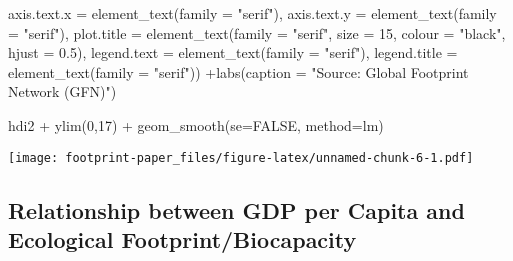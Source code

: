 \documentclass[
]{article}
\newenvironment{Shaded}{\begin{snugshade}}{\end{snugshade}}
\newcommand{\AttributeTok}[1]{\textcolor[rgb]{0.77,0.63,0.00}{#1}}
\newcommand{\ConstantTok}[1]{\textcolor[rgb]{0.00,0.00,0.00}{#1}}
\newcommand{\DecValTok}[1]{\textcolor[rgb]{0.00,0.00,0.81}{#1}}
\newcommand{\FloatTok}[1]{\textcolor[rgb]{0.00,0.00,0.81}{#1}}
\newcommand{\FunctionTok}[1]{\textcolor[rgb]{0.00,0.00,0.00}{#1}}
\newcommand{\NormalTok}[1]{#1}
\newcommand{\SpecialCharTok}[1]{\textcolor[rgb]{0.00,0.00,0.00}{#1}}
\newcommand{\StringTok}[1]{\textcolor[rgb]{0.31,0.60,0.02}{#1}}
\begin{document}
\begin{Shaded}
\begin{Highlighting}[]
                                 \AttributeTok{axis.text.x =} \FunctionTok{element\_text}\NormalTok{(}\AttributeTok{family =} \StringTok{"serif"}\NormalTok{),}
                                 \AttributeTok{axis.text.y =} \FunctionTok{element\_text}\NormalTok{(}\AttributeTok{family =} \StringTok{"serif"}\NormalTok{),}
                                 \AttributeTok{plot.title =} \FunctionTok{element\_text}\NormalTok{(}\AttributeTok{family =} \StringTok{"serif"}\NormalTok{,}
                                                           \AttributeTok{size =} \DecValTok{15}\NormalTok{, }\AttributeTok{colour =} \StringTok{"black"}\NormalTok{, }\AttributeTok{hjust =} \FloatTok{0.5}\NormalTok{),}
                                 \AttributeTok{legend.text =} \FunctionTok{element\_text}\NormalTok{(}\AttributeTok{family =} \StringTok{"serif"}\NormalTok{),}
                                 \AttributeTok{legend.title =} \FunctionTok{element\_text}\NormalTok{(}\AttributeTok{family =} \StringTok{"serif"}\NormalTok{)) }\SpecialCharTok{+}\FunctionTok{labs}\NormalTok{(}\AttributeTok{caption =} \StringTok{"Source: Global Footprint Network (GFN)"}\NormalTok{)}

\NormalTok{hdi2 }\SpecialCharTok{+} \FunctionTok{ylim}\NormalTok{(}\DecValTok{0}\NormalTok{,}\DecValTok{17}\NormalTok{) }\SpecialCharTok{+} \FunctionTok{geom\_smooth}\NormalTok{(}\AttributeTok{se=}\ConstantTok{FALSE}\NormalTok{, }\AttributeTok{method=}\NormalTok{lm)}
\end{Highlighting}
\end{Shaded}

\texttt{[image: footprint-paper\_files/figure-latex/unnamed-chunk-6-1.pdf]}

\hypertarget{relationship-between-gdp-per-capita-and-ecological-footprintbiocapacity}{%
\subsection{Relationship between GDP per Capita and Ecological
Footprint/Biocapacity}\label{relationship-between-gdp-per-capita-and-ecological-footprintbiocapacity}}
\end{document}
